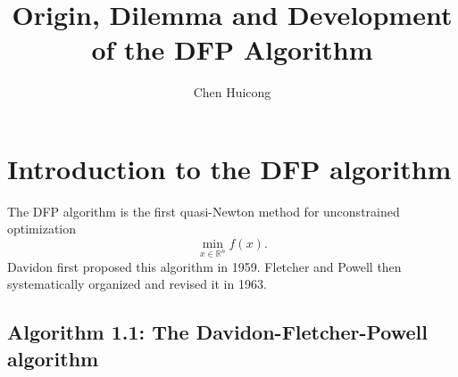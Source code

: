 \documentclass[12pt,a4paper]{article}  %
\title{ Origin, Dilemma and Development of the DFP Algorithm}
\date{\DTMnow}
\author{Chen Huicong}
\newcounter{cite}
\theoremstyle{definition}
\numberwithin{equation}{section}
\begin{document}
\maketitle






\section{Introduction to the DFP algorithm}
The DFP algorithm is the first quasi-Newton method for unconstrained optimization
\begin{equation}
	\min_{x \in \mathbb{R}^n} f(x)\text{.}
\end{equation}
Davidon first proposed this algorithm in 1959\cite{doi:10.1137/0801001}. Fletcher and Powell then systematically organized and revised it in 1963\cite{10.1093/comjnl/6.2.163}.



\subsection*{\normalsize Algorithm 1.1: The Davidon-Fletcher-Powell algorithm}\label{1.1}
\end{document}
